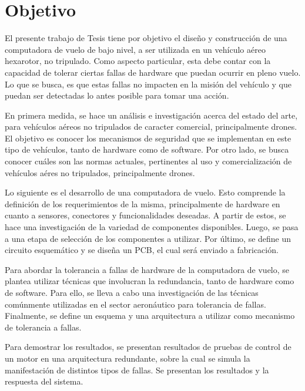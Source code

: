 \section{Objetivo}


El presente trabajo de Tesis tiene por objetivo el diseño y construcción de una computadora de vuelo de bajo nivel, a ser utilizada en un vehículo aéreo hexarotor, no tripulado. Como aspecto particular, esta debe contar con la capacidad de tolerar ciertas fallas de hardware que puedan ocurrir en pleno vuelo. Lo que se busca, es que estas fallas no impacten en la misión del vehículo y que puedan ser detectadas lo antes posible para tomar una acción.

En primera medida, se hace un análisis e investigación acerca del estado del arte, para vehículos aéreos no tripulados de caracter comercial, principalmente drones. El objetivo es conocer los mecanismos de seguridad que se implementan en este tipo de vehículos, tanto de hardware como de software. Por otro lado, se busca conocer cuáles son las normas actuales, pertinentes al uso y comercialización de vehículos aéres no tripulados, principalmente drones.

Lo siguiente es el desarrollo de una computadora de vuelo. Esto comprende la definición de los requerimientos de la misma, principalmente de hardware en cuanto a sensores, conectores y funcionalidades deseadas. A partir de estos, se hace una investigación de la variedad de componentes disponibles. Luego, se pasa a una etapa de selección de los componentes a utilizar. Por último, se define un circuito esquemático y se diseña un PCB, el cual será enviado a fabricación.

Para abordar la tolerancia a fallas de hardware de la computadora de vuelo, se plantea utilizar técnicas que involucran la redundancia, tanto de hardware como de software. Para ello, se lleva a cabo una investigación de las técnicas comúnmente utilizadas en el sector aeronáutico para tolerancia de fallas. Finalmente, se define un esquema y una arquitectura a utilizar como mecanismo de tolerancia a fallas.

Para demostrar los resultados, se presentan resultados de pruebas de control de un motor en una arquitectura redundante, sobre la cual se simula la manifestación de distintos tipos de fallas. Se presentan los resultados y la respuesta del sistema.